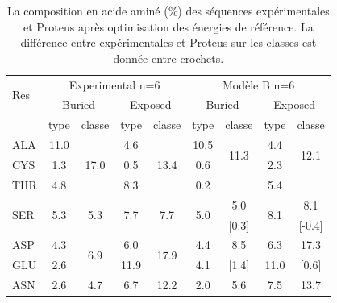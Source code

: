    \begin{table}
     \centering
\caption{La composition en acide aminé (\%) des séquences expérimentales et Proteus après optimisation des énergies de référence. La différence entre expérimentales et Proteus sur les classes est donnée entre crochets.}
\begin{tabular}{l|cccc|cccc}
\hline
\multirow{2}{*}{Res} & \multicolumn{4}{c|}{Experimental n=6}& \multicolumn{4}{c}{Modèle B n=6}\\
 & \multicolumn{2}{c}{Buried} & \multicolumn{2}{c|}{Exposed} & \multicolumn{2}{c}{Buried} & \multicolumn{2}{c}{Exposed} \\
\hline
 & type & classe & type & classe & type & classe & type & classe \\
\hline 
ALA                  & 11.0                 &  \multirow{3}{*}{17.0} & 4.6                  & \multirow{3}{*}{13.4}   &   10.5               & \multirow{2}{*}{11.3}   & 4.4 & \multirow{2}{*}{12.1} \\
CYS                  & 1.3                  &                        & 0.5                  &                         &    0.6               & \multirow{2}{*}{[5.7]}  & 2.3 & \multirow{2}{*}{[1.3]} \\
THR                  & 4.8                  &                        & 8.3                  &                         &    0.2               &                         & 5.4 &                       \\
\hline
\multirow{2}{*}{SER} & \multirow{2}{*}{5.3} & \multirow{2}{*}{5.3}   & \multirow{2}{*}{7.7} & \multirow{2}{*}{7.7}    & \multirow{2}{*}{5.0} &  5.0                    & \multirow{2}{*}{8.1} & 8.1 \\
                     &                      &                        &                      &                         &                      &  [0.3]                  &                      & [-0.4] \\
\hline
ASP                  & 4.3                  & \multirow{2}{*}{6.9}   & 6.0                  & \multirow{2}{*}{17.9}   &   4.4                &  8.5                    & 6.3    & 17.3   \\
GLU                  & 2.6                  &                        & 11.9                 &                         &   4.1                &  [1.4]                  & 11.0   &  [0.6] \\
\hline
ASN                  & 2.6                  & \multirow{2}{*}{4.7}   & 6.7                  & \multirow{2}{*}{12.2}   &   2.0                &  5.6                    & 7.5 & 13.7 \\

\end{tabular}
\end{table}
